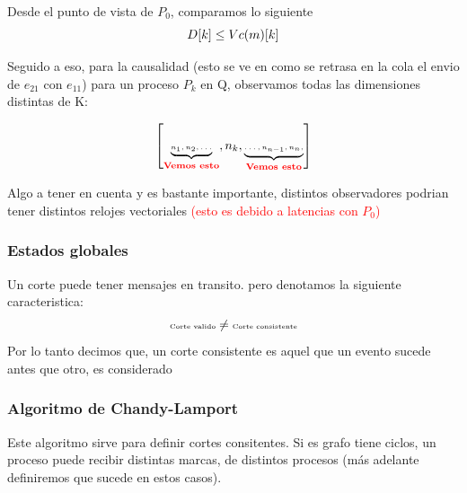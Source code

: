 Desde el punto de vista de $P_0$, comparamos lo siguiente
\[
  \tiny D[k]\leq Vc(m)[k]
\]

Seguido a eso, para la causalidad (esto se ve en como se retrasa en la cola el envio de $e_{21}$ con $e_{11}$) para un proceso $P_k$ en Q, observamos todas las dimensiones distintas de K:

\[
  \tiny \left[   \underbrace{n_1, n_2, \dots}_{\textcolor{red}{\textbf{Vemos esto}}}, n_k ,\underbrace{\dots,n_{n-1}, n_{n},}_{\textcolor{red}{\textbf{Vemos esto}}}   \right] 
\]

Algo a tener en cuenta y es bastante importante, distintos observadores podrian tener distintos relojes vectoriales \textcolor{red}{(esto es debido a latencias con $P_0$)}


\subsubsection{Estados globales}
Un corte puede tener mensajes en transito. pero denotamos la siguiente caracteristica:
\[
  \tiny  \text{Corte valido} \neq \text{Corte consistente}
\]
Por lo tanto decimos que, un corte consistente es aquel que un evento sucede antes que otro, es considerado

\subsubsection{Algoritmo de Chandy-Lamport}
Este algoritmo sirve para definir cortes consitentes. Si es grafo tiene ciclos, un proceso puede recibir distintas marcas, de distintos procesos (más adelante definiremos que sucede en estos casos).

